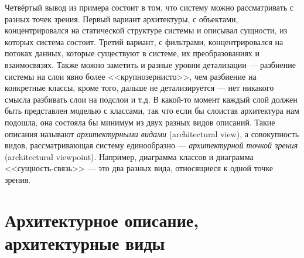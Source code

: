 \documentclass[a5paper]{article}
\begin{document}
Четвёртый вывод из примера состоит в том, что систему можно рассматривать с разных точек зрения. Первый вариант архитектуры, с объектами, концентрировался на статической структуре системы и описывал сущности, из которых система состоит. Третий вариант, с фильтрами, концентрировался на потоках данных, которые существуют в системе, их преобразованиях и взаимосвязях. Также можно заметить и разные уровни детализации --- разбиение системы на слои явно более <<крупнозернисто>>, чем разбиение на конкретные классы, кроме того, дальше не детализируется --- нет никакого смысла разбивать слои на подслои и т.д. В какой-то момент каждый слой должен быть представлен моделью с классами, так что если бы слоистая архитектура нам подошла, она состояла бы минимум из двух разных видов описаний. Такие описания называют \emph{архитектурными видами} (architectural view), а совокупность видов, рассматривающая систему единообразно --- \emph{архитектурной точкой зрения} (architectural viewpoint). Например, диаграмма классов и диаграмма <<сущность-связь>> --- это два разных вида, относящиеся к одной точке зрения.

\section{Архитектурное описание, архитектурные виды}
\end{document}
